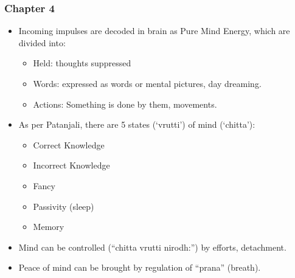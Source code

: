 \begin{frame}[fragile]
\frametitle{Chapter 4}
\begin{itemize}
\item Incoming impulses are decoded in brain as Pure Mind Energy, which are divided into:

\begin{itemize}
\item Held: thoughts suppressed
\item Words: expressed as words or mental pictures, day dreaming.
\item Actions: Something is done by them, movements.
\end{itemize}
\item As per Patanjali, there are 5 states (`vrutti') of mind (`chitta'):
\begin{itemize}
\item Correct Knowledge
\item Incorrect Knowledge
\item Fancy
\item Passivity (sleep)
\item Memory
\end{itemize}
\item Mind can be controlled (``chitta vrutti nirodh:'') by efforts, detachment.
\item Peace of mind can be brought by regulation of ``prana'' (breath).
\end{itemize}

\end{frame}

